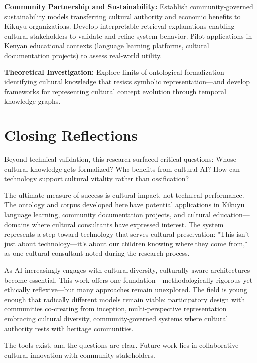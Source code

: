 \textbf{Community Partnership and Sustainability:} Establish community-governed sustainability models transferring cultural authority and economic benefits to Kikuyu organizations. Develop interpretable retrieval explanations enabling cultural stakeholders to validate and refine system behavior. Pilot applications in Kenyan educational contexts (language learning platforms, cultural documentation projects) to assess real-world utility.

\textbf{Theoretical Investigation:} Explore limits of ontological formalization—identifying cultural knowledge that resists symbolic representation—and develop frameworks for representing cultural concept evolution through temporal knowledge graphs.

\section{Closing Reflections}
\label{sec:reflections}

Beyond technical validation, this research surfaced critical questions: Whose cultural knowledge gets formalized? Who benefits from cultural AI? How can technology support cultural vitality rather than ossification?

The ultimate measure of success is cultural impact, not technical performance. The ontology and corpus developed here have potential applications in Kikuyu language learning, community documentation projects, and cultural education—domains where cultural consultants have expressed interest. The system represents a step toward technology that serves cultural preservation: "This isn't just about technology—it's about our children knowing where they come from," as one cultural consultant noted during the research process.

As AI increasingly engages with cultural diversity, culturally-aware architectures become essential. This work offers one foundation—methodologically rigorous yet ethically reflexive—but many approaches remain unexplored. The field is young enough that radically different models remain viable: participatory design with communities co-creating from inception, multi-perspective representation embracing cultural diversity, community-governed systems where cultural authority rests with heritage communities.

The tools exist, and the questions are clear. Future work lies in collaborative cultural innovation with community stakeholders.

